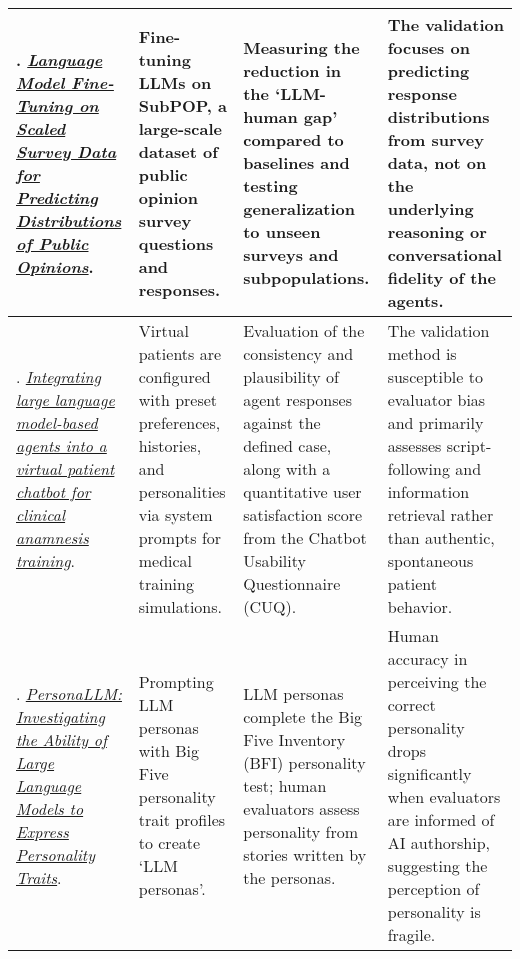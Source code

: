 {\begin{longtable}{| L{4.5cm} | L{3.5cm} | L{3.5cm} | L{3.5cm} |}
\\\hline
\citet{suh2025language}. \href{https://arxiv.org/abs/2502.16761}{\textit{Language Model Fine-Tuning on Scaled Survey Data for Predicting Distributions of Public Opinions}}. & Fine-tuning LLMs on SubPOP, a large-scale dataset of public opinion survey questions and responses. & Measuring the reduction in the `LLM-human gap' compared to baselines and testing generalization to unseen surveys and subpopulations. & The validation focuses on predicting response distributions from survey data, not on the underlying reasoning or conversational fidelity of the agents.
\\\hline
\citet{laverde2025integrating}. \href{https://doi.org/10.1016/j.csbj.2025.05.025}{\textit{Integrating large language model-based agents into a virtual patient chatbot for clinical anamnesis training}}. & Virtual patients are configured with preset preferences, histories, and personalities via system prompts for medical training simulations. & Evaluation of the consistency and plausibility of agent responses against the defined case, along with a quantitative user satisfaction score from the Chatbot Usability Questionnaire (CUQ). & The validation method is susceptible to evaluator bias and primarily assesses script-following and information retrieval rather than authentic, spontaneous patient behavior.
\\\hline
\citet{jiang-etal-2023-personallm}. \href{https://aclanthology.org/2024.findings-naacl.229/}{\textit{PersonaLLM: Investigating the Ability of Large Language Models to Express Personality Traits}}. & Prompting LLM personas with Big Five personality trait profiles to create `LLM personas'. & LLM personas complete the Big Five Inventory (BFI) personality test; human evaluators assess personality from stories written by the personas. & Human accuracy in perceiving the correct personality drops significantly when evaluators are informed of AI authorship, suggesting the perception of personality is fragile.
\\\hline

\end{longtable}
} %